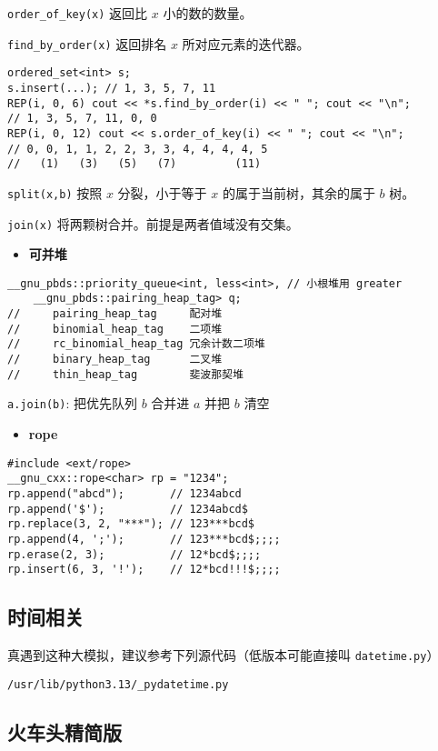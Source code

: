 \documentclass[a4paper,landscape,twocolumn]{ctexart}
\newcommand{\point}[1]{
	\begin{itemize}
		\item \textbf{#1}
	\end{itemize}
}
\begin{document}
\texttt{order\_of\_key(x)}  返回比 $x$ 小的数的数量。

\texttt{find\_by\_order(x)}  返回排名 $x$ 所对应元素的迭代器。

\begin{lstlisting}
ordered_set<int> s;
s.insert(...); // 1, 3, 5, 7, 11
REP(i, 0, 6) cout << *s.find_by_order(i) << " "; cout << "\n";
// 1, 3, 5, 7, 11, 0, 0
REP(i, 0, 12) cout << s.order_of_key(i) << " "; cout << "\n";
// 0, 0, 1, 1, 2, 2, 3, 3, 4, 4, 4, 4, 5
//   (1)   (3)   (5)   (7)         (11)
\end{lstlisting}

\texttt{split(x,b)} 按照 $x$ 分裂，小于等于 $x$ 的属于当前树，其余的属于 $b$ 树。

\texttt{join(x)} 将两颗树合并。前提是两者值域没有交集。

\point{可并堆}

\begin{lstlisting}
__gnu_pbds::priority_queue<int, less<int>, // 小根堆用 greater
	__gnu_pbds::pairing_heap_tag> q;
//     pairing_heap_tag     配对堆
//     binomial_heap_tag    二项堆
//     rc_binomial_heap_tag 冗余计数二项堆
//     binary_heap_tag      二叉堆
//     thin_heap_tag        斐波那契堆
\end{lstlisting}

\texttt{a.join(b)}: 把优先队列 $b$ 合并进 $a$ 并把 $b$ 清空

\point{rope}

\begin{lstlisting}
#include <ext/rope>
__gnu_cxx::rope<char> rp = "1234";
rp.append("abcd");       // 1234abcd
rp.append('$');          // 1234abcd$
rp.replace(3, 2, "***"); // 123***bcd$
rp.append(4, ';');       // 123***bcd$;;;;
rp.erase(2, 3);          // 12*bcd$;;;;
rp.insert(6, 3, '!');    // 12*bcd!!!$;;;;
\end{lstlisting}

\subsection{时间相关}

真遇到这种大模拟，建议参考下列源代码（低版本可能直接叫 \texttt{datetime.py}）

\texttt{/usr/lib/python3.13/\_pydatetime.py}

\subsection{火车头精简版}
\end{document}
